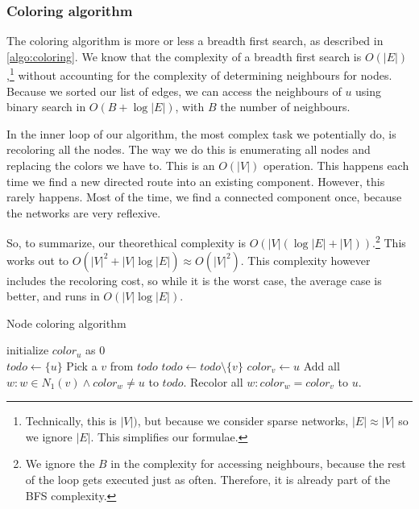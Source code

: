 \documentclass[12pt,a4paper,hidelinks]{article}
\begin{document}
\subsubsection*{Coloring algorithm}

The coloring algorithm is more or less a breadth first search, as described in \autoref{algo:coloring}. We know that the complexity of a breadth first search is $O(|E|)$,\footnote{Technically, this is $|V|)$, but because we consider sparse networks, $|E| \approx |V|$ so we ignore $|E|$. This simplifies our formulae.} without accounting for the complexity of determining neighbours for nodes. Because we sorted our list of edges, we can access the neighbours of $u$ using binary search in $O(B + \log |E|)$, with $B$ the number of neighbours.

In the inner loop of our algorithm, the most complex task we potentially do, is recoloring all the nodes. The way we do this is enumerating all nodes and replacing the colors we have to. This is an $O(|V|)$ operation. This happens each time we find a new directed route into an existing component. However, this rarely happens. Most of the time, we find a connected component once, because the networks are very reflexive.

So, to summarize, our theorethical complexity is $O(|V|(\log |E| + |V|))$.\footnote{We ignore the $B$ in the complexity for accessing neighbours, because the rest of the loop gets executed just as often. Therefore, it is already part of the BFS complexity.} This works out to $O(|V|^2 + |V|\log|E|) \approx O(|V|^2)$. This complexity however includes the recoloring cost, so while it is the worst case, the average case is better, and runs in $O(|V| \log |E|)$.

\begin{algorithm}
\caption{Node coloring algorithm}
\label{algo:coloring}
\begin{algorithmic}

	\State initialize $color_u$ as 0
\EndFor
\\
		\State $todo \gets \{u\}$
			\State Pick a $v$ from $todo$
			\State $todo \gets todo \setminus \{v\}$
					\State $color_v \gets u$
					\State Add all $w : w \in N_1(v) \land  color_w \neq u$ to $todo$.
				\Else
					\State Recolor all $w : color_w = color_v$ to $u$.
				\EndIf
			\EndIf
		\EndWhile
	\EndIf
\EndFor

\end{algorithmic}
\end{algorithm}
\end{document}
